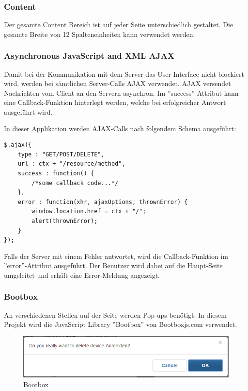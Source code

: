 \subsubsection{Content}
Der gesamte Content Bereich ist auf jeder Seite unterschiedlich gestaltet. Die gesamte Breite von 12 Spalteneinheiten kann verwendet werden.

\subsubsection{Asynchronous JavaScript and XML AJAX}
Damit bei der Kommunikation mit dem Server das User Interface nicht blockiert wird, werden bei sämtlichen Server-Calls AJAX verwendet. AJAX versendet Nachrichten vom Client an den Servern asynchron. Im ''success'' Attribut kann eine Callback-Funktion hinterlegt werden, welche bei erfolgreicher Antwort ausgeführt wird.

In dieser Applikation werden AJAX-Calls nach folgendem Schema ausgeführt:
\begin{lstlisting}
$.ajax({
	type : "GET/POST/DELETE",
	url : ctx + "/resource/method",
	success : function() {
		/*some callback code...*/
	},
	error : function(xhr, ajaxOptions, thrownError) {
		window.location.href = ctx + "/";
		alert(thrownError);
	}
});
\end{lstlisting}

Falls der Server mit einem Fehler antwortet, wird die Callback-Funktion im ''error''-Attribut ausgeführt. Der Benutzer wird dabei auf die Haupt-Seite umgeleitet und erhält eine Error-Meldung angezeigt.

\subsubsection{Bootbox}
An verschiedenen Stellen auf der Seite werden Pop-ups benötigt. In diesem Projekt wird die JavaScript Library ''Bootbox'' von Bootboxjs.com verwendet.

\begin{figure}[H]
\centering
\includegraphics[scale=0.9]{../04_Realisierung/images/userinterface/bootbox.png}
\caption{Bootbox}
\end{figure}

